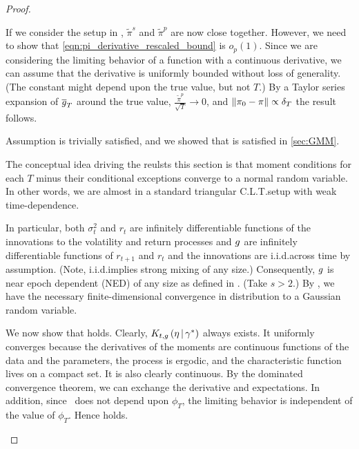 \documentclass[11pt, letterpaper, twoside, final]{article}
\begin{document}
\begin{appendices}
\begin{proof}
\begin{proofpart}
    If we consider the setup in , $\tilde{\pi}^s$ and $\tilde{\pi}^p$ are now close together.
    However, we need to show that \cref{eqn:pi_derivative_rescaled_bound} is $o_p(1)$.
    Since we are considering the limiting behavior of a function with a continuous derivative, we can assume that
    the derivative is uniformly bounded without loss of generality. 
    (The constant might depend upon the true value, but not $T$.)
    By a Taylor series expansion of $\overline{g}_T$ around the true value, $\frac{\widetilde{\pi}^p}{\sqrt{T}} \to 0$,
    and $\lVert\pi_0 - \pi\rVert \propto \delta_T$ the result follows.

\end{proofpart}

\begin{proofpart}
    \label{part:mainTheoremProofPart3}

    Assumption  is trivially satisfied,  and we showed that  is satisfied
    in \cref{sec:GMM}.  
        
    The conceptual idea driving the reulsts this section is that moment conditions for each $T$ minus their
    conditional exceptions converge to a normal random variable.
    In other words, we are almost in a standard triangular C.L.T.\@ setup with weak time-dependence.

    In particular, both $\sigma^2_t$ and $r_t$ are infinitely differentiable functions of the innovations to
    the volatility and return processes and $g$ are infinitely differentiable functions of $r_{t+1}$ and
    $r_t$ and the innovations are i.i.d.\@ across time by assumption.
    (Note, i.i.d.\@ implies strong mixing of any size.)
    Consequently, $g$ is near epoch dependent (NED) of any size as defined in
    \textcite{andrews1991empirical}.  
    (Take $s>2.$) 
    By \textcite[Theorem 3]{andrews1991empirical}, we have the necessary finite-dimensional convergence in
    distribution to a Gaussian random variable. 

    We now show that  holds.
    Clearly, $K_{t,g}\left(\eta \,\middle\vert\, \gamma^{*}\right)$ always exists.
    It uniformly converges because the derivatives of the moments are continuous functions of the data and the
    parameters, the process is ergodic, and the characteristic function lives on a compact set.
    It is also clearly continuous.
    By the dominated convergence theorem, we can exchange the derivative and expectations.
    In addition, since \popmom\ does not depend upon $\phi_T$, the limiting behavior is independent of the value
    of $\phi_T$.
    Hence  holds.
    

\end{proofpart}
\end{proof}
\end{appendices}
\end{document}
